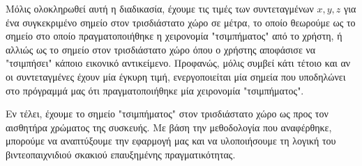Μόλις ολοκληρωθεί αυτή η διαδικασία, έχουμε τις τιμές των συντεταγμένων $x,y,z$ για ένα συγκεκριμένο σημείο στον τρισδιάστατο χώρο σε μέτρα, το οποίο θεωρούμε ως το σημείο στο οποίο πραγματοποιήθηκε η χειρονομία "τσιμπήματος" από το χρήστη, ή αλλιώς ως το σημείο στον τρισδιάστατο χώρο όπου ο χρήστης αποφάσισε να "τσιμπήσει" κάποιο εικονικό αντικείμενο. Προφανώς, μόλις συμβεί κάτι τέτοιο και αν οι συντεταγμένες έχουν μία έγκυρη τιμή, ενεργοποιείται μία σημεία που υποδηλώνει στο πρόγραμμά μας ότι πραγματοποιήθηκε μία χειρονομία "τσιμπήματος". 

Εν τέλει, έχουμε το σημείο "τσιμπήματος" στον τρισδιάστατο χώρο ως προς τον αισθητήρα χρώματος της συσκευής. Με βάση την μεθοδολογία που αναφέρθηκε, μπορούμε να αναπτύξουμε την εφαρμογή μας και να υλοποιήσουμε τη λογική του βιντεοπαιχνιδιού σκακιού επαυξημένης πραγματικότητας. 




